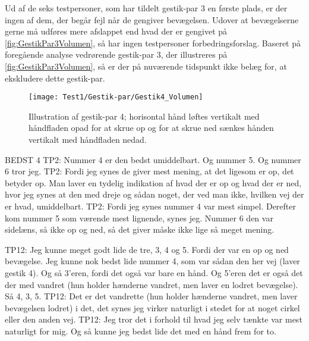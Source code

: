 Ud af de seks testpersoner, som har tildelt gestik-par 3 en første plads, er der ingen af dem, der begår fejl når de gengiver bevægelsen. Udover at bevægelserne gerne må udføres mere afslappet end hvad der er gengivet på \autoref{fig:GestikPar3Volumen}, så har ingen testpersoner forbedringsforslag. Baseret på foregående analyse vedrørende gestik-par 3, der illustreres på \autoref{fig:GestikPar3Volumen}, så er der på nuværende tidspunkt ikke belæg for, at ekskludere dette gestik-par.
%
\begin{figure}[H]
	\centering
	\texttt{[image: Test1/Gestik-par/Gestik4\_Volumen]}
	\caption{Illustration af gestik-par 4; horisontal hånd løftes vertikalt med håndfladen opad for at skrue op og for at skrue ned sænkes hånden vertikalt med håndfladen nedad.}
	\label{fig:GestikPar4Volumen}
\end{figure}
\noindent
%









BEDST 4 
TP2: Nummer 4 er den bedst umiddelbart. Og nummer 5. Og nummer 6 tror jeg.
TP2: Fordi jeg synes de giver mest mening, at det ligesom er op, det betyder op. Man laver en tydelig indikation af hvad der er op og hvad der er ned, hvor jeg synes at den med dreje og sådan noget, der ved man ikke, hvilken vej der er hvad, umiddelbart.
TP2: Fordi jeg synes nummer 4 var mest simpel. Derefter kom nummer 5 som værende mest lignende, synes jeg. Nummer 6 den var sidelæns, så ikke op og ned, så det giver måske ikke lige så meget mening.  


TP12: Jeg kunne meget godt lide de tre, 3, 4 og 5. Fordi der var en op og ned bevægelse. Jeg kunne nok bedst lide nummer 4, som var sådan den her vej (laver gestik 4). Og så 3’eren, fordi det også var bare en hånd. Og 5’eren det er også det der med vandret (hun holder hænderne vandret, men laver en lodret bevægelse). Så 4, 3, 5. 
TP12: Det er det vandrette (hun holder hænderne vandret, men laver bevægelsen lodret) i det, det synes jeg virker naturligt i stedet for at noget cirkel eller den anden vej. 
TP12: Jeg tror det i forhold til hvad jeg selv tænkte var mest naturligt for mig. Og så kunne jeg bedst lide det med en hånd frem for to. 

